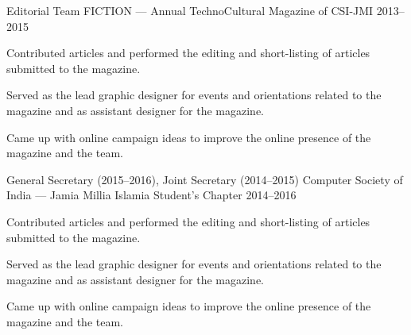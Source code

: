 
\begin{cventries}

\cventry%
  {Editorial Team} %
  {FICTION --- Annual TechnoCultural Magazine of CSI-JMI} %
  {} %
  {2013--2015} %
  {%
    \begin{cvitems} %
      \item{Contributed articles and performed the editing and short-listing of
            articles submitted to the magazine.}
      \item{Served as the lead graphic designer for events and orientations
            related to the magazine and as assistant designer for the magazine.}
      \item{Came up with online campaign ideas to improve the online presence
            of the magazine and the team.}
    \end{cvitems}
  }

\cventry%
  {General Secretary (2015--2016), Joint Secretary (2014--2015)} %
  {Computer Society of India --- Jamia Millia Islamia Student's Chapter} %
  {} %
  {2014--2016} %
  {%
    \begin{cvitems} %
      \item{Contributed articles and performed the editing and short-listing of
            articles submitted to the magazine.}
      \item{Served as the lead graphic designer for events and orientations
            related to the magazine and as assistant designer for the magazine.}
      \item{Came up with online campaign ideas to improve the online presence
            of the magazine and the team.}
    \end{cvitems}
  }


\end{cventries}
